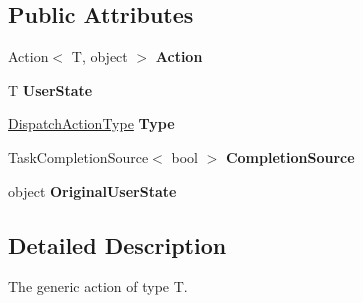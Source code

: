 \subsection*{Public Attributes}
\begin{DoxyCompactItemize}
\item 
\hypertarget{class_cloud_api_public_1_1_support_1_1_dispatch_action_generic_3_01_t_01_4_ad34f8d1e715826a8818fc3d234ebd445}{Action$<$ T, object $>$ {\bfseries Action}}\label{class_cloud_api_public_1_1_support_1_1_dispatch_action_generic_3_01_t_01_4_ad34f8d1e715826a8818fc3d234ebd445}

\item 
\hypertarget{class_cloud_api_public_1_1_support_1_1_dispatch_action_generic_3_01_t_01_4_ada070614fb77fb25416fd5c5cb7f763f}{T {\bfseries User\-State}}\label{class_cloud_api_public_1_1_support_1_1_dispatch_action_generic_3_01_t_01_4_ada070614fb77fb25416fd5c5cb7f763f}

\item 
\hypertarget{class_cloud_api_public_1_1_support_1_1_dispatch_action_generic_3_01_t_01_4_a8e9816110ad60634d57c0ab740f79001}{\hyperlink{namespace_cloud_api_public_1_1_support_ae4ed3cc109410edb339c363c77eb4117}{Dispatch\-Action\-Type} {\bfseries Type}}\label{class_cloud_api_public_1_1_support_1_1_dispatch_action_generic_3_01_t_01_4_a8e9816110ad60634d57c0ab740f79001}

\item 
\hypertarget{class_cloud_api_public_1_1_support_1_1_dispatch_action_generic_3_01_t_01_4_adbcc9aded19bc0cd39af8dcf440905d5}{Task\-Completion\-Source$<$ bool $>$ {\bfseries Completion\-Source}}\label{class_cloud_api_public_1_1_support_1_1_dispatch_action_generic_3_01_t_01_4_adbcc9aded19bc0cd39af8dcf440905d5}

\item 
\hypertarget{class_cloud_api_public_1_1_support_1_1_dispatch_action_generic_3_01_t_01_4_af44fa59f8bf7153f5b4a7493e0748cd6}{object {\bfseries Original\-User\-State}}\label{class_cloud_api_public_1_1_support_1_1_dispatch_action_generic_3_01_t_01_4_af44fa59f8bf7153f5b4a7493e0748cd6}

\end{DoxyCompactItemize}


\subsection{Detailed Description}
The generic action of type T. 



